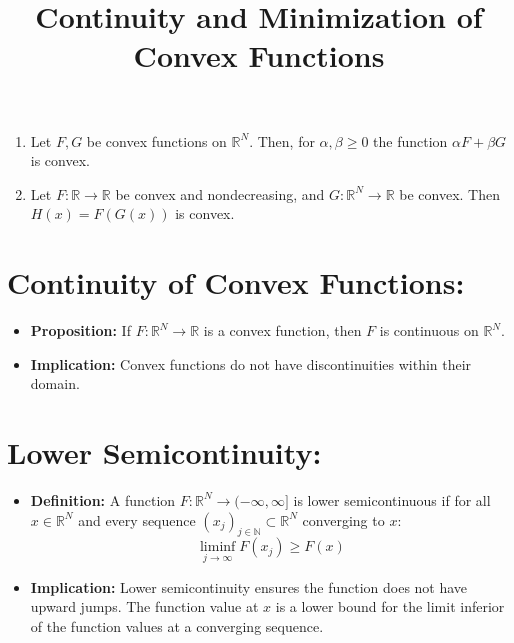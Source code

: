 \documentclass{article}
\begin{document}
\begin{enumerate}
    \item Let $F, G$ be convex functions on $\mathbb{R}^N$. Then, for $\alpha, \beta \geq 0$ the function $\alpha F + \beta G$ is convex.
    \item Let $F : \mathbb{R} \rightarrow \mathbb{R}$ be convex and nondecreasing, and $G : \mathbb{R}^N \rightarrow \mathbb{R}$ be convex. Then $H(x) = F(G(x))$ is convex.
\end{enumerate}









\title{Continuity and Minimization of Convex Functions}
\author{}
\date{}


\maketitle

\section*{Continuity of Convex Functions:}

\begin{itemize}
    \item \textbf{Proposition:} If \( F : \mathbb{R}^N \to \mathbb{R} \) is a convex function, then \( F \) is continuous on \( \mathbb{R}^N \).
    \item \textbf{Implication:} Convex functions do not have discontinuities within their domain.
\end{itemize}

\section*{Lower Semicontinuity:}

\begin{itemize}
    \item \textbf{Definition:} A function \( F : \mathbb{R}^N \to (-\infty, \infty] \) is lower semicontinuous if for all \( x \in \mathbb{R}^N \) and every sequence \( (x_j)_{j \in \mathbb{N}} \subset \mathbb{R}^N \) converging to \( x \):
    \[
    \liminf_{j \to \infty} F(x_j) \geq F(x)
    \]
    \item \textbf{Implication:} Lower semicontinuity ensures the function does not have upward jumps. The function value at \( x \) is a lower bound for the limit inferior of the function values at a converging sequence.
\end{itemize}
\end{document}
